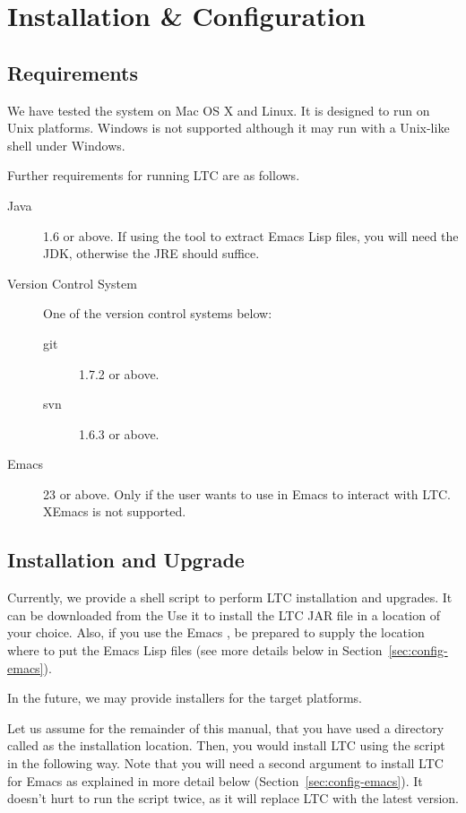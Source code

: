 \chapter{Installation \& Configuration} \label{ch:install}

\section{Requirements}

We have tested the system on Mac OS X and Linux. It is designed to run on Unix platforms. Windows is not supported although it may run with a Unix-like shell under Windows.

Further requirements for running LTC are as follows.
\begin{description}
\item[Java] 1.6 or above.  If using the  tool to extract Emacs Lisp files, you will need the JDK, otherwise the JRE should suffice.
\item[Version Control System]  One of the version control systems below:
  \begin{description}
  \item[git] 1.7.2 or above.
  \item[svn] 1.6.3 or above.
  \end{description}
\item[Emacs] 23 or above.  Only if the user wants to use  in Emacs to interact with LTC.  XEmacs is not supported.
\end{description}

\section{Installation and Upgrade}

Currently, we provide a shell script  to perform LTC installation and upgrades.  It can be downloaded from the   Use it to install the LTC JAR file in a location of your choice.  Also, if you use the Emacs , be prepared to supply the location where to put the Emacs Lisp files (see more details below in Section~\ref{sec:config-emacs}).

In the future, we may provide installers for the target platforms.

Let us assume for the remainder of this manual, that you have used a directory called  as the installation location. Then, you would install LTC using the script in the following way.  Note that you will need a second argument to install LTC for Emacs as explained in more detail below (Section~\ref{sec:config-emacs}).  It doesn't hurt to run the script twice, as it will replace LTC with the latest version.

